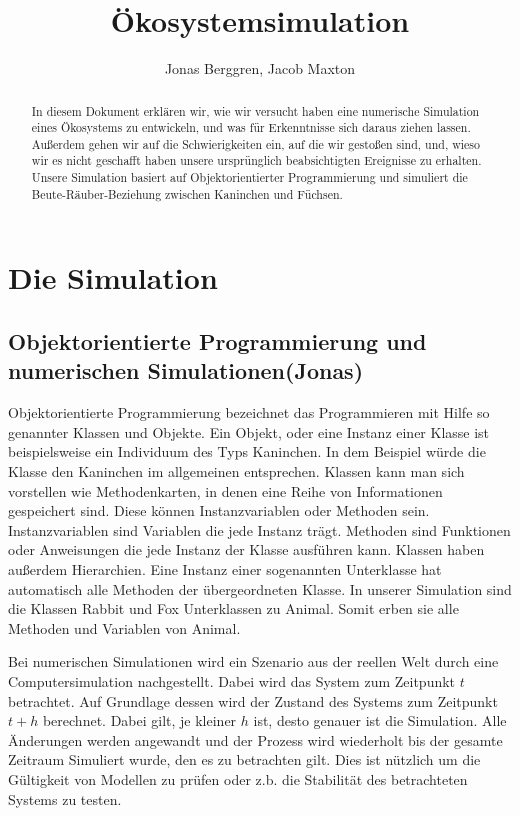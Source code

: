 \documentclass[12pt]{article}
\author{{\Large Jonas Berggren, Jacob Maxton}}
\title{{\myfont Ökosystemsimulation}}
\begin{document}
\maketitle
\begin{abstract}
In diesem Dokument erklären wir, wie wir versucht haben eine numerische Simulation eines Ökosystems zu entwickeln, und was für Erkenntnisse sich daraus ziehen lassen.
Außerdem gehen wir auf die Schwierigkeiten ein, auf die wir gestoßen sind, und, wieso wir es nicht geschafft haben unsere ursprünglich beabsichtigten Ereignisse zu erhalten.
Unsere Simulation basiert auf Objektorientierter Programmierung und simuliert die Beute-Räuber-Beziehung zwischen Kaninchen und Füchsen.
\end{abstract}
\tableofcontents
\newpage
\section{Die Simulation}
\subsection{Objektorientierte Programmierung und numerischen Simulationen(Jonas)}
Objektorientierte Programmierung bezeichnet das Programmieren mit Hilfe so genannter Klassen und Objekte.
Ein Objekt, oder eine Instanz einer Klasse ist beispielsweise ein Individuum des Typs Kaninchen.
In dem Beispiel würde die Klasse den Kaninchen im allgemeinen entsprechen.
Klassen kann man sich vorstellen wie Methodenkarten, in denen eine Reihe von Informationen gespeichert sind.
Diese können Instanzvariablen oder Methoden sein.
Instanzvariablen sind Variablen die jede Instanz trägt.
Methoden sind Funktionen oder Anweisungen die jede Instanz der Klasse ausführen kann.
Klassen haben außerdem Hierarchien.
Eine Instanz einer sogenannten Unterklasse hat automatisch alle Methoden der übergeordneten Klasse.
In unserer Simulation sind die Klassen \colorbox{gray!40}{Rabbit} und
\colorbox{gray!40}{Fox} Unterklassen zu \colorbox{gray!40}{Animal}.
Somit erben sie alle Methoden und Variablen von \colorbox{gray!40}{Animal}.

Bei numerischen Simulationen wird ein Szenario aus der reellen Welt durch eine Computersimulation nachgestellt.
Dabei wird das System zum Zeitpunkt $t$ betrachtet.
Auf Grundlage dessen wird der Zustand des Systems zum Zeitpunkt $t + h$ berechnet.
Dabei gilt, je kleiner $h$ ist, desto genauer ist die Simulation.
Alle Änderungen werden angewandt und der Prozess wird wiederholt bis der gesamte Zeitraum Simuliert wurde, den es zu betrachten gilt.
Dies ist nützlich um die Gültigkeit von Modellen zu prüfen oder z.b. die Stabilität des betrachteten Systems zu testen.
\end{document}
